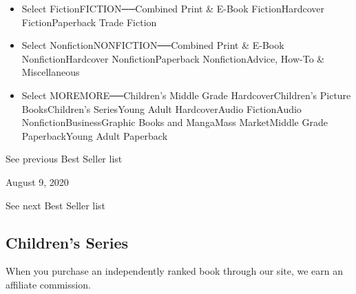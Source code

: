 \begin{itemize}
\tightlist
\item
  Select FictionFICTION──Combined Print \& E-Book FictionHardcover
  FictionPaperback Trade Fiction
\item
  Select NonfictionNONFICTION──Combined Print \& E-Book
  NonfictionHardcover NonfictionPaperback NonfictionAdvice, How-To \&
  Miscellaneous
\item
  Select MOREMORE──Children's Middle Grade HardcoverChildren's Picture
  BooksChildren's SeriesYoung Adult HardcoverAudio FictionAudio
  NonfictionBusinessGraphic Books and MangaMass MarketMiddle Grade
  PaperbackYoung Adult Paperback
\end{itemize}

\href{/books/best-sellers/2020/08/02/series-books/}{}

See previous Best Seller list

August 9, 2020

See next Best Seller list

\hypertarget{childrens-series}{%
\subsection{Children's Series}\label{childrens-series}}

When you purchase an independently ranked book through our site, we earn
an affiliate commission.

